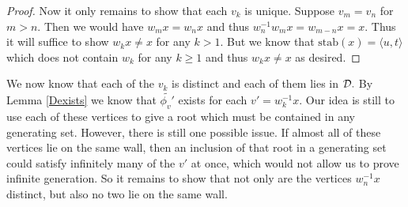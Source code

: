 \documentclass[class=book, crop=false,12 pt]{standalone}
\begin{document}
\begin{proof}
Now it only remains to show that each $v_k$ is unique. Suppose $v_m=v_n$ for $m>n.$ Then we would have $w_mx=w_nx$ and thus $w^{-1}_n w_mx=w_{m-n}x=x.$ Thus it will suffice to show $w_kx\neq x$ for any $k>1.$ But we know that $\mathrm{stab}(x)=\langle u,t \rangle$ which does not contain $w_k$ for any $k\ge 1$ and thus $w_kx\neq x$ as desired.

\end{proof}

We now know that each of the $v_k$ is distinct and each of them lies in $\mathcal{D}.$ By Lemma \ref{Dexists} we know that $\tilde{\phi_v'}$ exists for each $v'=w_k^{-1}x.$ Our idea is still to use each of these vertices to give a root which must be contained in any generating set. However, there is still one possible issue. If almost all of these vertices lie on the same wall, then an inclusion of that root in a generating set could satisfy infinitely many of the $v'$ at once, which would not allow us to prove infinite generation. So it remains to show that not only are the vertices $w_n^{-1}x$ distinct, but also no two lie on the same wall.
\end{document}
